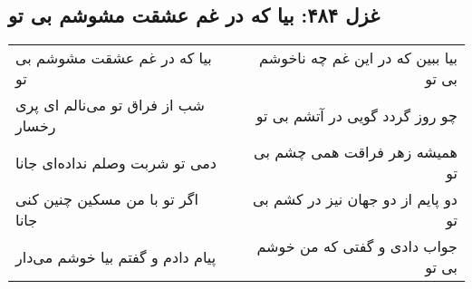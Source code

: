 \begin{center}
\section*{غزل ۴۸۴: بیا که در غم عشقت مشوشم بی تو}
\label{sec:484}
\begin{longtable}{l p{0.5cm} r}
بیا که در غم عشقت مشوشم بی تو
&&
بیا ببین که در این غم چه ناخوشم بی تو
\\
شب از فراق تو می‌نالم ای پری رخسار
&&
چو روز گردد گویی در آتشم بی تو
\\
دمی تو شربت وصلم نداده‌ای جانا
&&
همیشه زهر فراقت همی چشم بی تو
\\
اگر تو با من مسکین چنین کنی جانا
&&
دو پایم از دو جهان نیز در کشم بی تو
\\
پیام دادم و گفتم بیا خوشم می‌دار
&&
جواب دادی و گفتی که من خوشم بی تو
\\
\end{longtable}
\end{center}
